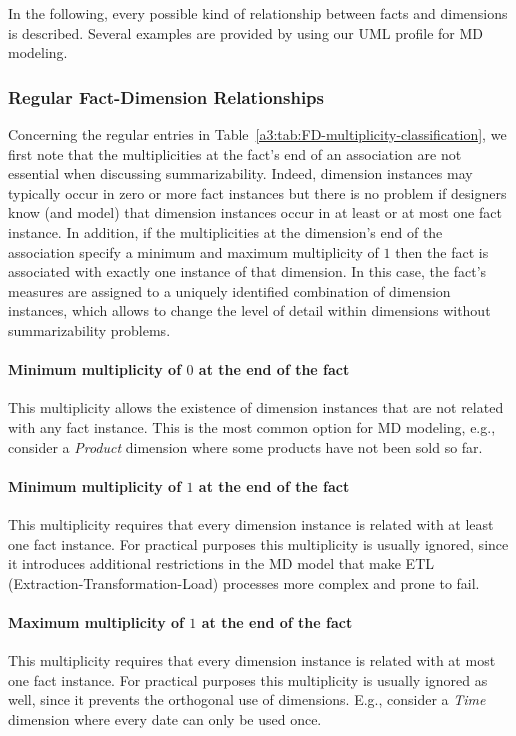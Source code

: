 In the following, every possible kind of relationship between facts
and dimensions is described. Several examples are provided by using
our UML profile for MD modeling.

\subsubsection{Regular Fact-Dimension Relationships}
Concerning the regular entries in
Table~\ref{a3:tab:FD-multiplicity-classification}, we first note
that the multiplicities at the fact's end of an association are not
essential when discussing summarizability.  Indeed, dimension
instances may typically occur in zero or more fact instances but
there is no problem if designers know (and model) that dimension
instances occur in at least or at most one fact instance.  In
addition, if the multiplicities at the dimension's end of the
association specify a minimum and maximum multiplicity of $1$ then
the fact is associated with exactly one instance of that dimension.
In this case, the fact's measures are assigned to a uniquely
identified combination of dimension instances, which allows to
change the level of detail within dimensions without summarizability
problems.

\paragraph{Minimum multiplicity of $0$ at the end of the fact} This multiplicity
allows the existence of dimension instances that are not related
with any fact instance. This is the most common option for MD
modeling, e.g., consider a \emph{Product} dimension where some
products have not been sold so far.

\paragraph{Minimum multiplicity of $1$ at the end of the fact} This multiplicity
requires that every dimension instance is related with at least one
fact instance. For practical purposes this multiplicity is usually
ignored, since it introduces additional restrictions in the MD model
that make ETL (Extraction-Transformation-Load) processes more
complex and prone to fail.

\paragraph{Maximum multiplicity of $1$ at the end of the fact} This multiplicity
requires that every dimension instance is related with at most one
fact instance. For practical purposes this multiplicity is usually
ignored as well, since it prevents the orthogonal use of dimensions.
E.g., consider a \emph{Time} dimension where every date can only be
used once.

